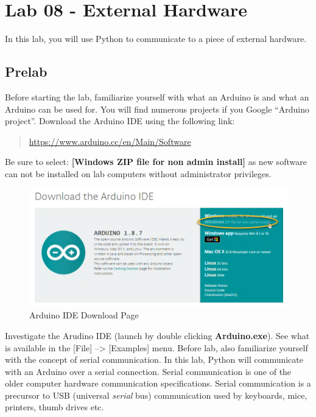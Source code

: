 

    


\hypertarget{lab-08---external-hardware}{%
\section{Lab 08 - External Hardware}\label{lab-08---external-hardware}}

In this lab, you will use Python to communicate to a piece of external
hardware.

\hypertarget{prelab}{%
\subsection{Prelab}\label{prelab}}

Before starting the lab, familiarize yourself with what an Arduino is
and what an Arduino can be used for. You will find numerous projects if
you Google ``Arduino project''. Download the Arduino IDE using the
following link:

\begin{quote}
\href{https://www.arduino.cc/en/Main/Software}{https://www.arduino.cc/en/Main/Software}
\end{quote}

Be sure to select: \textbf{{[}Windows ZIP file for non admin install{]}}
as new software can not be installed on lab computers without
administrator privileges.

\begin{figure}[h!]
\centering
\includegraphics{images/arduino_download_page.png}
\caption{Arduino IDE Download Page}
\end{figure}

Investigate the Arudino IDE (launch by double clicking
\textbf{Arduino.exe}). See what is available in the {[}File{]}
--\textgreater{} {[}Examples{]} menu. Before lab, also familiarize
yourself with the concept of serial communication. In this lab, Python
will communicate with an Arduino over a serial connection. Serial
communication is one of the older computer hardware communication
specifications. Serial communication is a precursor to USB (universal
\emph{serial} bus) communication used by keyboards, mice, printers,
thumb drives etc.

